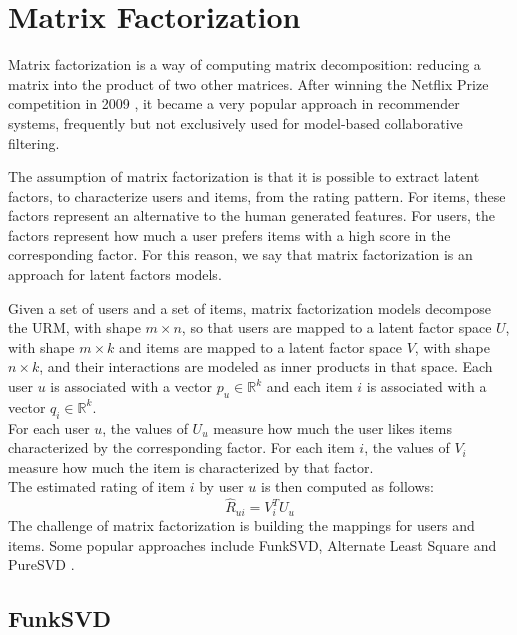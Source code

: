 \section{Matrix Factorization}
\label{sc:matrix-factorization}

Matrix factorization \cite{10.1109/MC.2009.263} is a way of computing matrix decomposition: reducing a matrix into the product of two other matrices. After winning the Netflix Prize competition in 2009 \cite{netflix-prize}, it became a very popular approach in recommender systems, frequently but not exclusively used for model-based collaborative filtering.\par
The assumption of matrix factorization is that it is possible to extract latent factors, to characterize users and items, from the rating pattern. For items, these factors represent an alternative to the human generated features. For users, the factors represent how much a user prefers items with a high score in the corresponding factor. For this reason, we say that matrix factorization is an approach for latent factors models.\par
Given a set of users and a set of items, matrix factorization models decompose the URM, with shape $m \times n$, so that users are mapped to a latent factor space $U$, with shape $m \times k$ and items are mapped to a latent factor space $V$, with shape $n \times k$, and their interactions are modeled as inner products in that space. Each user $u$ is associated with a vector $p_u \in \mathbb{R}^k$ and each item $i$ is associated with a vector $q_i \in \mathbb{R}^k$.\\
For each user $u$, the values of $U_u$ measure how much the user likes items characterized by the corresponding factor. For each item $i$, the values of $V_i$ measure how much the item is characterized by that factor.\\
The estimated rating of item $i$ by user $u$ is then computed as follows:
\begin{equation*}
\hat{R}_{ui} = V_i^T U_u
\end{equation*}
The challenge of matrix factorization is building the mappings for users and items. Some popular approaches include FunkSVD, Alternate Least Square \cite{10.1109/MC.2009.263} and PureSVD \cite{10.1145/1864708.1864721}.


\subsection{FunkSVD}

